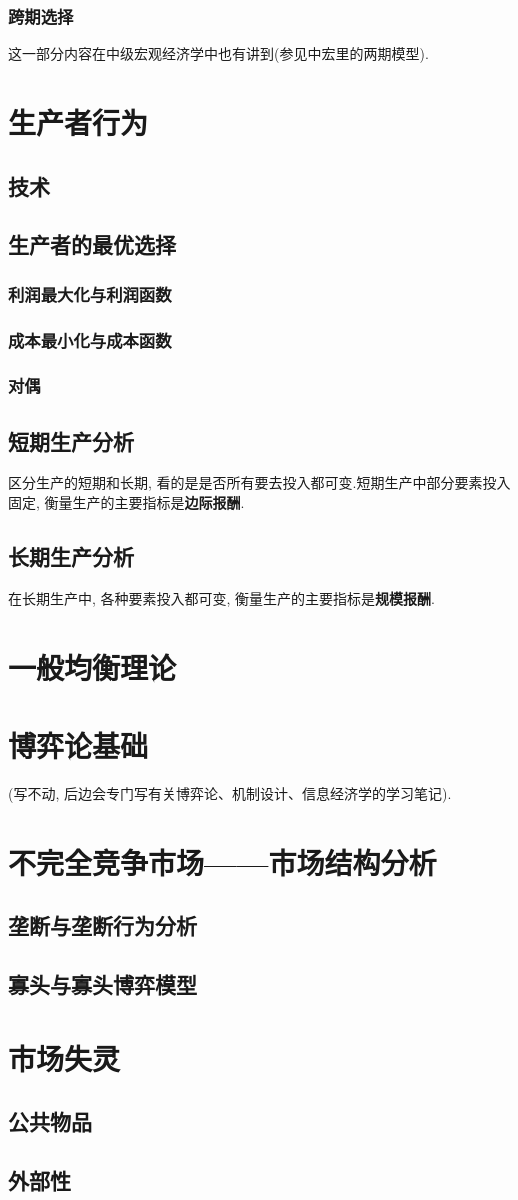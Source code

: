 \documentclass[lang=cn,10pt]{elegantbook}
\begin{document}
\subsection{跨期选择}
这一部分内容在中级宏观经济学中也有讲到(参见中宏里的两期模型).
\newpage

\chapter{生产者行为}
\section{技术}
\section{生产者的最优选择}
\subsection{利润最大化与利润函数}
\subsection{成本最小化与成本函数}
\subsection{对偶}
\section{短期生产分析}
区分生产的短期和长期, 看的是是否所有要去投入都可变.短期生产中部分要素投入固定, 衡量生产的主要指标是\textbf{边际报酬}.
\section{长期生产分析}
在长期生产中, 各种要素投入都可变, 衡量生产的主要指标是\textbf{规模报酬}.
\chapter{一般均衡理论}

\chapter{博弈论基础}
(写不动, 后边会专门写有关博弈论、机制设计、信息经济学的学习笔记).
\chapter{不完全竞争市场——市场结构分析}
\section{垄断与垄断行为分析}
\section{寡头与寡头博弈模型}
\chapter{市场失灵}
\section{公共物品}
\section{外部性}
\end{document}
